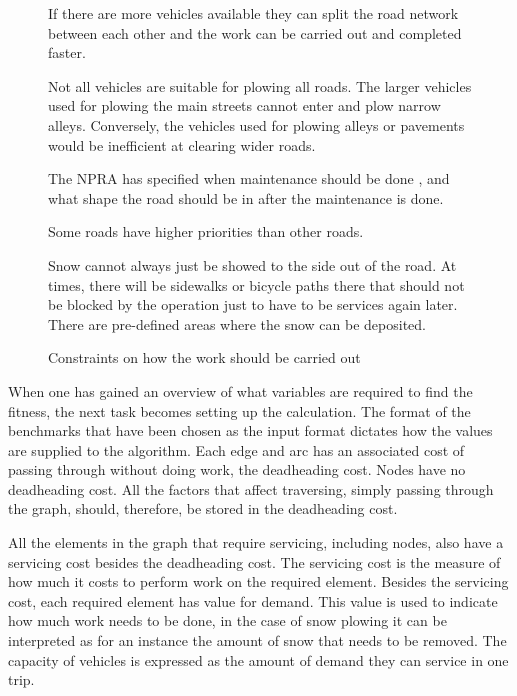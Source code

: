 \begin{figure}[thbp]
\caption{Constraints on how the work should be carried out}
\label{fig:imposed_constraints}
\begin{description}
    \item [Equipment -- Amount of vehicles available.] If there are more vehicles available they can split the road network between each other and the work can be carried out and completed faster.
    \item [Equipment -- Types of vehicles available.] Not all vehicles are suitable for plowing all roads. The larger vehicles used for plowing the main streets cannot enter and plow narrow alleys. Conversely, the vehicles used for plowing alleys or pavements would be inefficient at clearing wider roads.
    \item [The weather.] The NPRA has specified when maintenance should be done \citep{svvR610}, and what shape the road should be in after the maintenance is done.
    \item [The type of road.] Some roads have higher priorities than other roads.
    \item [Where the snow can be stored.] Snow cannot always just be showed to the side out of the road. At times, there will be sidewalks or bicycle paths there that should not be blocked by the operation just to have to be services again later. There are pre-defined areas where the snow can be deposited.
\end{description}
\end{figure}


When one has gained an overview of what variables are required to find the fitness, the next task becomes setting up the calculation. The format of the benchmarks that have been chosen as the input format dictates how the values are supplied to the algorithm. Each edge and arc has an associated cost of passing through without doing work, the deadheading cost. Nodes have no deadheading cost. All the factors that affect traversing, simply passing through the graph, should, therefore, be stored in the deadheading cost.

All the elements in the graph that require servicing, including nodes, also have a servicing cost besides the deadheading cost. The servicing cost is the measure of how much it costs to perform work on the required element. Besides the servicing cost, each required element has value for demand. This value is used to indicate how much work needs to be done, in the case of snow plowing it can be interpreted as for an instance the amount of snow that needs to be removed. The capacity of vehicles is expressed as the amount of demand they can service in one trip.

